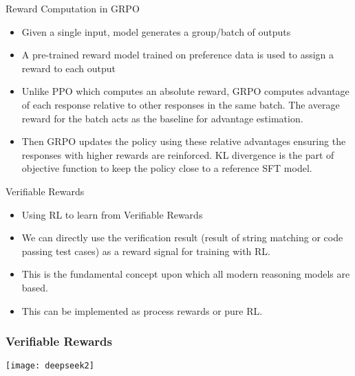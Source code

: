 \begin{frame}[fragile]{Reward Computation in GRPO}


    \begin{itemize}
        \item    Given a single input, model generates a group/batch of outputs
        \item    A pre-trained reward model trained on preference data is used to assign a 
reward to each output
        \item    Unlike PPO which computes an absolute reward, GRPO computes 
advantage of each response relative to other responses in the same batch. 
The average reward for the batch acts as the baseline for advantage estimation.
        \item     Then GRPO updates the policy using these relative advantages ensuring the 
responses with higher rewards are reinforced. KL divergence is the part of 
objective function to keep the policy close to a reference SFT model. 
    \end{itemize}
\end{frame}

\begin{frame}[fragile]{Verifiable Rewards}


    \begin{itemize}
        \item   Using RL to learn from Verifiable Rewards
        \item    We can directly use the verification result (result of string matching 
or code passing test cases) as a reward signal for training with RL. 
        \item   This is the fundamental concept upon which all modern reasoning 
models are based.
        \item    This can be implemented as process rewards or pure RL. 
    \end{itemize}
\end{frame}

\begin{frame}[fragile]\frametitle{ Verifiable Rewards}
		\begin{center}
		\texttt{[image: deepseek2]}
		\end{center}

\end{frame}

